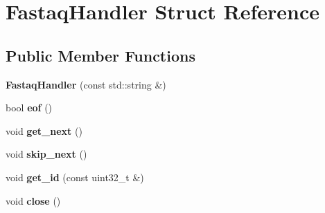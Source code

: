 \hypertarget{structFastaqHandler}{}\section{Fastaq\+Handler Struct Reference}
\label{structFastaqHandler}
\subsection*{Public Member Functions}
\begin{DoxyCompactItemize}
\item 
\mbox{\label{structFastaqHandler_afd44d688f206d1497b2227b76e5a909a}} 
{\bfseries Fastaq\+Handler} (const std\+::string \&)
\item 
\mbox{\label{structFastaqHandler_ab01e7ae2660aa05fb074eaf9a6157e07}} 
bool {\bfseries eof} ()
\item 
\mbox{\label{structFastaqHandler_a840c42aaf62d3a1c98c8bec4b06304aa}} 
void {\bfseries get\+\_\+next} ()
\item 
\mbox{\label{structFastaqHandler_a8e542a130cab24e699f1c3ee384ca4f7}} 
void {\bfseries skip\+\_\+next} ()
\item 
\mbox{\label{structFastaqHandler_a7641712493aa5f0165d10eb85cdc1502}} 
void {\bfseries get\+\_\+id} (const uint32\+\_\+t \&)
\item 
\mbox{\label{structFastaqHandler_a30de9d99aa75f02f93f6abbe648e8f40}} 
void {\bfseries close} ()
\end{DoxyCompactItemize}
